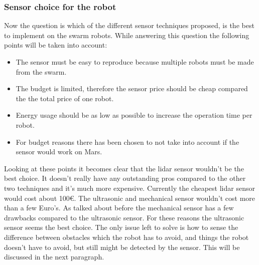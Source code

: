 \documentclass[10pt,a4paper]{article}
\begin{document}
\subsubsection{Sensor choice for the robot}
Now the question is which of the different sensor techniques proposed, is the best to implement on the swarm robots. While answering this question the following points will be taken into account:

\begin{itemize}
    \item The sensor must be easy to reproduce because multiple robots must be made from the swarm.
    \item The budget is limited, therefore the sensor price should be cheap compared the the total price of one robot.
    \item Energy usage should be as low as possible to increase the operation time per robot.
    \item For budget reasons there has been chosen to not take into account if the sensor would work on Mars.
\end{itemize}

Looking at these points it becomes clear that the lidar sensor wouldn't be the best choice. It doesn't really have any outstanding pros compared to the other two techniques and it's much more expensive. Currently the cheapest lidar sensor would cost about 100$\euro$. The ultrasonic and mechanical sensor wouldn't cost more than a few Euro's. As talked about before the mechanical sensor has a few drawbacks compared to the ultrasonic sensor. For these reasons the ultrasonic sensor seems the best choice. The only issue left to solve is how to sense the difference between obstacles which the robot has to avoid, and things the robot doesn't have to avoid, but still might be detected by the sensor. This will be discussed in the next paragraph.
\end{document}
